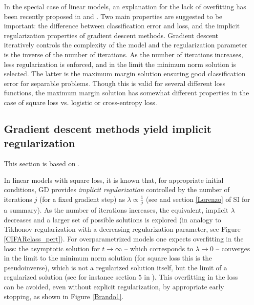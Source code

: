 \documentclass[10pt]{article}
\begin{document}
In the special case of linear models, an explanation for the lack of
overfitting has been recently proposed in \cite{2017arXiv171010345S}
and \cite{RosascoRecht2017}.  Two main properties are suggested to be
important: the difference between classification error and loss, and
the implicit regularization properties of gradient descent methods.
Gradient descent iteratively controls the complexity of the model and
the regularization parameter is the inverse of the number of
iterations. As the number of iterations increases, less regularization
is enforced, and in the limit the minimum norm solution is selected.
The latter is the maximum margin solution ensuring good classification
error for separable problems. Though this is valid for several
different loss functions, the maximum margin solution has somewhat
different properties in the case of square loss vs. logistic or
cross-entropy loss.


\subsection{Gradient descent methods yield implicit regularization}

This section is based on \cite{RosascoRecht2017}. 

In linear models with square loss, it is known that, for appropriate
initial conditions, GD provides {\it implicit regularization}
controlled by the number of iterations $j$ (for a fixed gradient step)
as $\lambda \propto \frac{1}{j}$ (see \cite{rosasco2015learning} and
section \ref{Lorenzo} of SI for a summary). As the number of
iterations increases, the equivalent, implicit $\lambda$ decreases and
a larger set of possible solutions is explored (in analogy to Tikhonov
regularization with a decreasing regularization parameter, see Figure
\ref{CIFARclass_pert}).  For overparametrized models one expects
overfitting in the loss: the asymptotic solution for $t \to \infty$ --
which corresponds to $\lambda \to 0$ -- converges in the limit to the
minimum norm solution (for square loss this is the pseudoinverse),
which is not a regularized solution itself, but the limit of a
regularized solution (see for instance section $5$ in
\cite{DBLP:journals/corr/ZhangBHRV16}).  This overfitting in the loss
can be avoided, even without explicit regularization, by appropriate
early stopping, as shown in Figure \ref{Brando1}.
 
\end{document}
